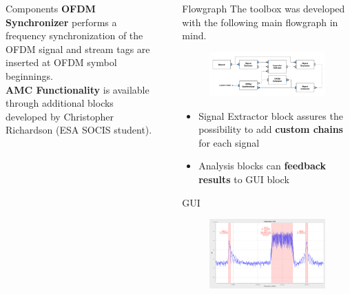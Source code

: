 \documentclass{beamer}
\begin{document}
\begin{frame}
\begin{columns}[t]
\begin{column}{0.33\textwidth}
\begin{block}{Components}
\textbf{OFDM Synchronizer}
performs a frequency synchronization of the OFDM signal and stream tags are inserted at OFDM symbol beginnings.\\[0.5em]

\textbf{AMC Functionality}
is available through additional blocks developed by Christopher Richardson (ESA SOCIS student).

\vspace{1.5em}
      \end{block}
    \end{column}
    \begin{column}{0.01\textwidth}
    \end{column}
    \begin{column}{0.66\textwidth}
      \begin{block}{Flowgraph}
        The toolbox was developed with the following main flowgraph in mind.
        \begin{figure}
          \includegraphics[width=\textwidth]{figures/flowgraph}
        \end{figure}
        \begin{itemize}
          \item Signal Extractor block assures the possibility to add \textbf{custom chains} for each signal 
          \item Analysis blocks can \textbf{feedback results} to GUI block
        \end{itemize}
      \end{block}
      \begin{block}{GUI}
      \begin{figure}
      	\includegraphics[width=\textwidth]{figures/gui.png}

\end{figure}
\end{block}
\end{column}
\end{columns}
\end{frame}
\end{document}
